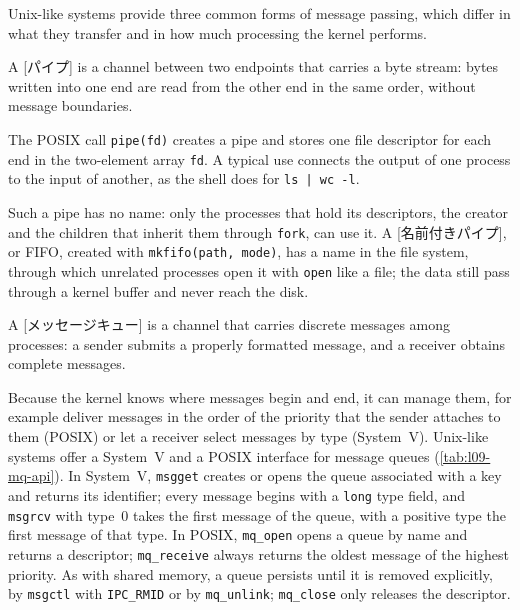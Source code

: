 \documentclass[../main.tex]{subfiles}
\begin{document}
Unix-like systems provide three common forms of message
passing,
which differ in what they transfer and in how much processing the kernel
performs.

\begin{definition}[Pipe]
  A [パイプ] is a channel between two endpoints that carries a
  byte stream: bytes written into one end are read from the other end in
  the same order, without message boundaries.
\end{definition}

The POSIX call \texttt{pipe(fd)} creates a pipe and stores one file
descriptor for each end in the two-element array \texttt{fd}.  A typical use
connects the output of one process to the input of another, as the shell
does for \texttt{ls | wc -l}.

Such a pipe has no name: only the processes that hold its descriptors, the
creator and the children that inherit them through \texttt{fork}, can use
it.  A [名前付きパイプ], or FIFO, created with
\texttt{mkfifo(path, mode)}, has a name in the file system, through which
unrelated processes open it with \texttt{open} like a file; the data still
pass through a kernel buffer and never reach the disk.

\begin{definition}
  A [メッセージキュー] is a channel that carries
  discrete messages among processes: a sender submits a properly formatted
  message, and a receiver obtains complete messages.
\end{definition}

Because the kernel knows where messages begin and end, it can manage them,
for example deliver messages in the order of the priority that the sender
attaches to them (POSIX) or let a receiver select messages by type
(System~V).  Unix-like systems offer a System~V and a POSIX interface for
message queues (\cref{tab:l09-mq-api}).  In System~V, \texttt{msgget} creates or opens
the queue associated with a key and returns its identifier; every message
begins with a \texttt{long} type field, and \texttt{msgrcv} with type~0
takes the first message of the queue, with a positive type the first
message of that type.  In POSIX, \texttt{mq\_open} opens a queue by name
and returns a descriptor; \texttt{mq\_receive} always returns the oldest
message of the highest priority.  As with shared memory, a queue persists
until it is removed explicitly, by \texttt{msgctl} with \texttt{IPC\_RMID}
or by \texttt{mq\_unlink}; \texttt{mq\_close} only releases the
descriptor.
\end{document}
